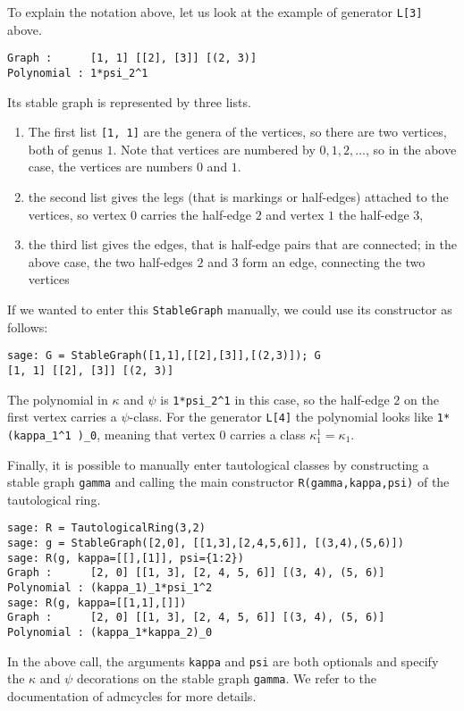 \documentclass[11pt]{article}
\begin{document}
To explain the notation above, let us look at the example of generator \verb|L[3]| above.
\begin{lstlisting}
Graph :      [1, 1] [[2], [3]] [(2, 3)]
Polynomial : 1*psi_2^1
\end{lstlisting}
Its stable graph is represented by three lists.
\begin{enumerate}
 \item The first list \verb|[1, 1]| are the genera of the vertices, so there are two vertices, both of genus $1$. Note that vertices are numbered by $0,1,2, \ldots$, so in the above case, the vertices are numbers $0$ and $1$.
 \item the second list gives the legs (that is markings or half-edges) attached to the vertices, so vertex $0$ carries the half-edge $2$ and vertex $1$ the half-edge $3$,
 \item the third list gives the edges, that is half-edge pairs that are connected; in the above case, the two half-edges $2$ and $3$ form an edge, connecting the two vertices
\end{enumerate}
If we wanted to enter this \verb|StableGraph| manually, we could use its constructor as follows:
\begin{lstlisting}
sage: G = StableGraph([1,1],[[2],[3]],[(2,3)]); G
[1, 1] [[2], [3]] [(2, 3)]
\end{lstlisting}

The polynomial in $\kappa$ and $\psi$ is \verb|1*psi_2^1| in this case, so the half-edge $2$ on the first vertex carries a $\psi$-class. For the generator \verb|L[4]| the polynomial looks like \verb|1*(kappa_1^1 )_0|, meaning that vertex $0$ carries a class $\kappa_1^1=\kappa_1$.


Finally, it is possible to manually enter tautological classes by constructing a stable graph \texttt{gamma} and calling the main constructor \texttt{R(gamma,kappa,psi)} of the tautological ring.
\begin{lstlisting}
sage: R = TautologicalRing(3,2)
sage: g = StableGraph([2,0], [[1,3],[2,4,5,6]], [(3,4),(5,6)])
sage: R(g, kappa=[[],[1]], psi={1:2})
Graph :      [2, 0] [[1, 3], [2, 4, 5, 6]] [(3, 4), (5, 6)]
Polynomial : (kappa_1)_1*psi_1^2 
sage: R(g, kappa=[[1,1],[]])
Graph :      [2, 0] [[1, 3], [2, 4, 5, 6]] [(3, 4), (5, 6)]
Polynomial : (kappa_1*kappa_2)_0
\end{lstlisting}
In the above call, the arguments \verb|kappa| and \verb|psi| are both optionals and specify the $\kappa$ and $\psi$ decorations on the stable graph \verb|gamma|. We refer to the documentation of admcycles for more details.
\end{document}
